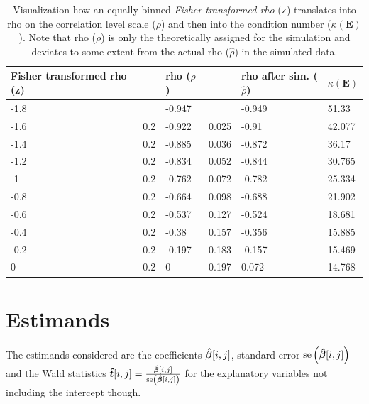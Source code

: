 \documentclass[11pt,a4paper,twoside]{book}\usepackage[]{graphicx}\usepackage[]{xcolor}
\begin{document}
\begin{table}[H]\begin{center}
\caption{Visualization how an equally binned \textit{Fisher transformed rho} (\texttt{z}) translates into rho on the correlation level scale ($\rho$) and then into the condition number ($\kappa\left(\boldsymbol{E}\right)$). Note that rho ($\rho$) is only the theoretically assigned for the simulation and deviates to some extent from the actual rho ($\hat\rho$) in the simulated data.}\label{tab:rho}
\begingroup\footnotesize
\begin{tabular}{llllll}
  \toprule
Fisher transformed rho (z) &  & rho ($\rho$) &  & rho after sim. ($\hat\rho$) & $\kappa\left(\boldsymbol{E}\right)$ \\ 
  \midrule
-1.8 &  & -0.947 &  & -0.949 & 51.33 \\ 
  -1.6 & 0.2 & -0.922 & 0.025 & -0.91 & 42.077 \\ 
  -1.4 & 0.2 & -0.885 & 0.036 & -0.872 & 36.17 \\ 
  -1.2 & 0.2 & -0.834 & 0.052 & -0.844 & 30.765 \\ 
  -1 & 0.2 & -0.762 & 0.072 & -0.782 & 25.334 \\ 
  -0.8 & 0.2 & -0.664 & 0.098 & -0.688 & 21.902 \\ 
  -0.6 & 0.2 & -0.537 & 0.127 & -0.524 & 18.681 \\ 
  -0.4 & 0.2 & -0.38 & 0.157 & -0.356 & 15.885 \\ 
  -0.2 & 0.2 & -0.197 & 0.183 & -0.157 & 15.469 \\ 
  0 & 0.2 & 0 & 0.197 & 0.072 & 14.768 \\ 
   \bottomrule
\end{tabular}
\endgroup

\end{center}\end{table}





\section{Estimands}

The estimands considered are the coefficients ${\boldsymbol{\hat\beta}}[i,j]$, standard error $\operatorname{se}\left({\boldsymbol{\hat\beta}}[i,j]\right)$ and the Wald statistics ${\boldsymbol{\hat{t}}}[i,j]=\frac{{\boldsymbol{\hat\beta}}[i,j]}{\operatorname{se}\left({\boldsymbol{\hat\beta}}[i,j]\right)}$ for the explanatory variables not including the intercept though.
\end{document}
